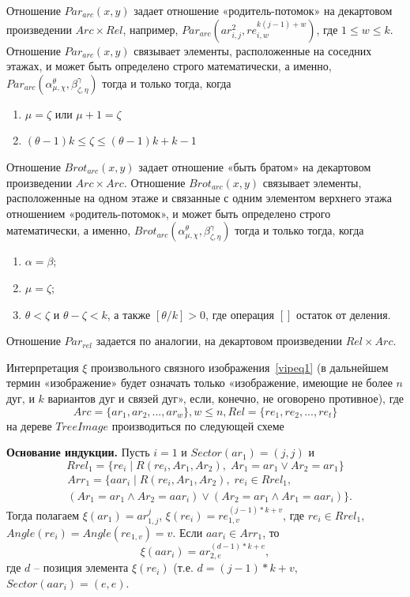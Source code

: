 Отношение $Par_{arc}(x,y)$ задает отношение «родитель-потомок» на 
декартовом произведении $Arc \times Rel$,
например, $Par_{arc}(ar_{i,j}^2, re_{i,w}^{k(j-1)+w})$, где $1 \le w 
\le k$. Отношение $Par_{arc}(x,y)$ связывает элементы, расположенные на 
соседних этажах, и может быть определено строго математически, а именно, 
$Par_{arc}(\alpha_{\mu,\chi}^\theta, \beta_{\zeta,\eta}^\gamma)$ тогда и только 
тогда, когда 
\begin{enumerate}
\item $\mu=\zeta$ или $\mu + 1 =\zeta$
\item $(\theta - 1)k \leq \zeta \leq (\theta - 1)k + k-1$
\end{enumerate}
Отношение $Brot_{arc}(x,y)$ задает отношение «быть братом» на 
декартовом произведении $Arc \times Arc$.
Отношение  $Brot_{arc}(x,y)$  связывает элементы, расположенные на одном этаже 
и связанные с одним элементом верхнего этажа отношением «ро\-ди\-тель-потомок», 
и может быть определено строго математически, а именно, 
$Brot_{arc}(\alpha_{\mu,\chi}^\theta, \beta_{\zeta,\eta}^\gamma)$ тогда и 
только тогда, когда
\begin{enumerate}
\item $\alpha=\beta$;
\item $\mu=\zeta$;
\item $\theta < \zeta$ и $\theta-\zeta<k$, а также $[\theta / k ]>0$, где 
операция $[ ]$ остаток от деления.
\end{enumerate}
Отношение $Par_{rel}$ задается по аналогии, на декартовом 
произведении $Rel \times Arc$.

Интерпретация $\xi$ произвольного связного изображения~\ref{vipeq1} (в дальнейшем термин «изображение» будет означать только «изображение, имеющие не более $n$ дуг, и $k$ вариантов дуг и связей дуг», если, конечно, не оговорено противное), где
\begin{equation}
Arc = \{ar_1, ar_2, ..., ar_w\}, w\le n, Rel=\{re_1, re_2, ..., re_t\}
\label{vipeq5}
\end{equation}
на дереве $TreeImage$ производиться по следующей схеме

\textbf{Основание индукции.} Пусть $i = 1$ и $Sector(ar_1) = (j, j)$ и 
$$Rrel_1 = \{ re_i\;|\;R(re_i, Ar_1 , Ar_2),\;Ar_1 = ar_1 \vee Ar_2 = ar_1 \}$$
\begin{eqnarray*}
&Arr_1 = \{ aar_i\;|\;R (re_i, Ar_1 , Ar_2),\;re_i \in Rrel_1,\nonumber \\ 
&(Ar_1 = ar_1 \wedge Ar_2 = aar_i) \vee (Ar_2 = ar_1 \wedge Ar_1 = aar_i) \}.
\end{eqnarray*}
Тогда полагаем $\xi(ar_1) = ar_{1,j}^j$, $\xi(re_i) = re_{1,v}^{(j-1)*k+v}$, где $re_i \in Rrel_1$, $Angle(re_i) = Angle(re_{1,v}) = v$. 
Если $aar_i \in Arr_1$, то $$\xi(aar_i)=ar_{2,e}^{(d-1)*k+e},$$ где $d$ – позиция элемента $\xi(re_i)$ (т.е. $d =(j-1)*k+v$, $Sector(aar_i) = (e, e)$.

